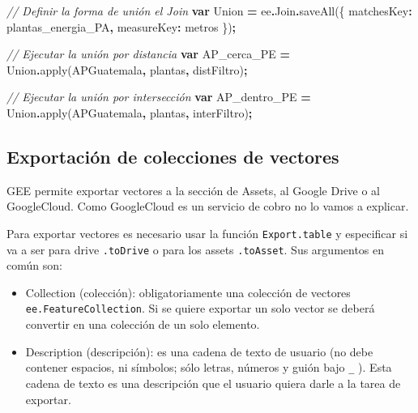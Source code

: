 \documentclass[
  12pt,
  letterpaper,
  twoside]{book}
\newenvironment{Shaded}{\begin{snugshade}}{\end{snugshade}}
\newcommand{\AttributeTok}[1]{\textcolor[rgb]{0.77,0.63,0.00}{#1}}
\newcommand{\CommentTok}[1]{\textcolor[rgb]{0.56,0.35,0.01}{\textit{#1}}}
\newcommand{\DataTypeTok}[1]{\textcolor[rgb]{0.13,0.29,0.53}{#1}}
\newcommand{\FunctionTok}[1]{\textcolor[rgb]{0.00,0.00,0.00}{#1}}
\newcommand{\KeywordTok}[1]{\textcolor[rgb]{0.13,0.29,0.53}{\textbf{#1}}}
\newcommand{\NormalTok}[1]{#1}
\newcommand{\OperatorTok}[1]{\textcolor[rgb]{0.81,0.36,0.00}{\textbf{#1}}}
\newcommand{\StringTok}[1]{\textcolor[rgb]{0.31,0.60,0.02}{#1}}
\providecommand{\tightlist}{%
  \setlength{\itemsep}{0pt}\setlength{\parskip}{0pt}}
\begin{document}
\begin{Shaded}
\begin{Highlighting}[]
\CommentTok{// Definir la forma de unión el Join}
\KeywordTok{var}\NormalTok{ Union }\OperatorTok{=}\NormalTok{ ee}\OperatorTok{.}\AttributeTok{Join}\OperatorTok{.}\FunctionTok{saveAll}\NormalTok{(\{}
  \DataTypeTok{matchesKey}\OperatorTok{:} \StringTok{\textquotesingle{}plantas\_energia\_PA\textquotesingle{}}\OperatorTok{,}
  \DataTypeTok{measureKey}\OperatorTok{:} \StringTok{\textquotesingle{}metros\textquotesingle{}}
\NormalTok{\})}\OperatorTok{;}

\CommentTok{// Ejecutar la unión por distancia}
\KeywordTok{var}\NormalTok{ AP\_cerca\_PE }\OperatorTok{=}\NormalTok{ Union}\OperatorTok{.}\FunctionTok{apply}\NormalTok{(APGuatemala}\OperatorTok{,}\NormalTok{ plantas}\OperatorTok{,}\NormalTok{ distFiltro)}\OperatorTok{;}

\CommentTok{// Ejecutar la unión por intersección}
\KeywordTok{var}\NormalTok{ AP\_dentro\_PE }\OperatorTok{=}\NormalTok{ Union}\OperatorTok{.}\FunctionTok{apply}\NormalTok{(APGuatemala}\OperatorTok{,}\NormalTok{ plantas}\OperatorTok{,}\NormalTok{ interFiltro)}\OperatorTok{;}
\end{Highlighting}
\end{Shaded}

\hypertarget{exportaciuxf3n-de-colecciones-de-vectores}{%
\subsection*{Exportación de colecciones de vectores}\label{exportaciuxf3n-de-colecciones-de-vectores}}

GEE permite exportar vectores a la sección de Assets, al Google Drive o al GoogleCloud. Como GoogleCloud es un servicio de cobro no lo vamos a explicar.

Para exportar vectores es necesario usar la función \texttt{Export.table} y especificar si va a ser para drive \texttt{.toDrive} o para los assets \texttt{.toAsset}. Sus argumentos en común son:

\begin{itemize}
\tightlist
\item
  Collection (colección): obligatoriamente una colección de vectores \texttt{ee.FeatureCollection}. Si se quiere exportar un solo vector se deberá convertir en una colección de un solo elemento.
\item
  Description (descripción): es una cadena de texto de usuario (no debe contener espacios, ni símbolos; sólo letras, números y guión bajo \texttt{\_} ). Esta cadena de texto es una descripción que el usuario quiera darle a la tarea de exportar.
\end{itemize}
\end{document}
